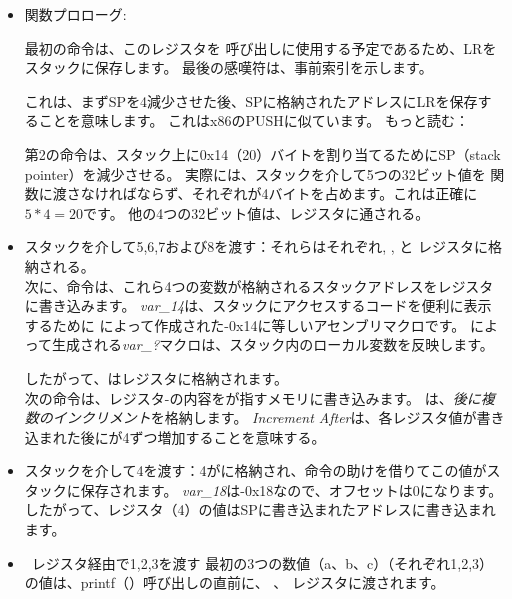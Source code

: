 \begin{itemize}
\item 関数プロローグ:

最初の命令は、このレジスタを \printf 呼び出しに使用する予定であるため、\ac{LR}をスタックに保存します。 
最後の感嘆符は、事前索引を示します。

これは、まず\ac{SP}を4減少させた後、\ac{SP}に格納されたアドレスに\ac{LR}を保存することを意味します。
これはx86のPUSHに似ています。 
もっと読む：

第2の命令は、スタック上に0x14（20）バイトを割り当てるために\ac{SP}（\gls{stack pointer}）を減少させる。 
実際には、スタックを介して5つの32ビット値を \printf 関数に渡さなければならず、それぞれが4バイトを占めます。これは正確に$5*4=20$です。
他の4つの32ビット値は、レジスタに通される。

\item スタックを介して5,6,7および8を渡す：それらはそれぞれ, ,  と レジスタに格納される。\\
次に、命令は、これら4つの変数が格納されるスタックアドレスをレジスタに書き込みます。 
\emph{var\_14}は、スタックにアクセスするコードを便利に表示するために \IDA によって作成された-0x14に等しいアセンブリマクロです。 
\IDA によって生成される\emph{var\_?}マクロは、スタック内のローカル変数を反映します。

したがって、はレジスタに格納されます。\\
次の命令は、レジスタ-の内容をが指すメモリに書き込みます。 
は、\emph{後に複数のインクリメント}を格納します。 
\emph{Increment After}は、各レジスタ値が書き込まれた後にが4ずつ増加することを意味する。

\item スタックを介して4を渡す：4がに格納され、命令の助けを借りてこの値がスタックに保存されます。
\emph{var\_18}は-0x18なので、オフセットは0になります。したがって、レジスタ（4）の値は\ac{SP}に書き込まれたアドレスに書き込まれます。

\item レジスタ経由で1,2,3を渡す
最初の3つの数値（a、b、c）（それぞれ1,2,3）の値は、printf（）呼び出しの直前に、 、 レジスタに渡されます。


\end{itemize}
